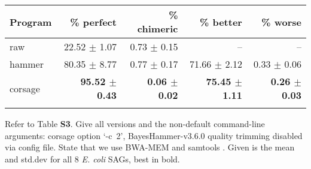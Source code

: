 \documentclass{bioinfo}
\begin{document}
\begin{table}[t]
{\footnotesize
\begin{tabular}{lrrrr}
\toprule
Program  & \% perfect            & \% chimeric               & \% better             & \% worse \\
\midrule
raw      & 22.52 $\pm$ 1.07      & 0.73 $\pm$ 0.15           & --                    & -- \\
hammer   & 80.35 $\pm$ 8.77      & 0.77 $\pm$ 0.17           & 71.66 $\pm$ 2.12      & 0.33 $\pm$ 0.06 \\
corsage  & \textbf{95.52 $\pm$ 0.43}      & \textbf{0.06 $\pm$ 0.02}           & \textbf{75.45 $\pm$ 1.11}      & \textbf{0.26 $\pm$ 0.03} \\
\botrule
\end{tabular}}{Refer to Table \textbf{S3}. %
Give all versions and the non-default command-line arguments: corsage option `\mbox{-c 2}', BayesHammer-v3.6.0 quality trimming disabled via config file.
State that we use BWA-MEM \citep{bwamem} and samtools \citep{samtools}.
Given is the mean and std.dev for all 8 \textit{E. coli} SAGs, best in bold.
}
\end{table}
\end{document}
